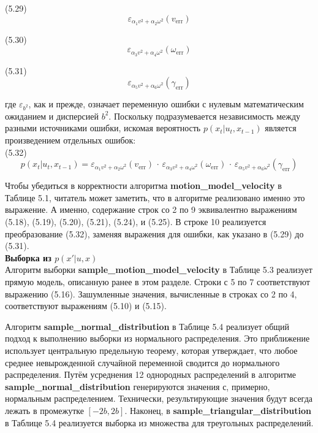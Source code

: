 \documentclass[10pt,a4paper]{article}
\begin{document}
(5.29)
$$\varepsilon_{\alpha_1v^2+\alpha_2\omega^2}(v_{\text{err}})$$

(5.30)
$$\varepsilon_{\alpha_3v^2+\alpha_4\omega^2}(\omega_{\text{err}})$$

(5.31)
$$\varepsilon_{\alpha_5v^2+\alpha_6\omega^2}(\gamma_{\text{err}})$$

где $\varepsilon_{b^2}$, как и прежде, означает переменную ошибки с нулевым математическим ожиданием и дисперсией $b^2$.
Поскольку подразумевается независимость между разными источниками ошибки, искомая вероятность $p(x_t | u_t, x_{t-1})$ является произведением отдельных ошибок:\\

(5.32)
$$p(x_t|u_t,x_{t-1})=\varepsilon_{\alpha_1v^2+\alpha_2\omega^2}(v_{\text{err}})\,\cdot\,\varepsilon_{\alpha_3v^2+\alpha_4\omega^2}(\omega_{\text{err}})\,\cdot\,\varepsilon_{\alpha_5v^2+\alpha_6\omega^2}(\gamma_{\text{err}})$$

Чтобы убедиться в корректности алгоритма \textbf{motion\_model\_velocity} в Таблице 5.1,
читатель может заметить, что в алгоритме реализовано именно это выражение. А именно, содержание строк со 2 по 9 эквивалентно выражениям (5.18), (5.19), (5.20), (5.21), (5.24), и (5.25). В строке 10 реализуется преобразование (5.32), заменяя выражения для ошибки, как указано в (5.29) до (5.31).\\

\textbf{Выборка из $p(x' | u, x)$}\\

Алгоритм выборки \textbf{sample\_motion\_model\_velocity} в Таблице 5.3 реализует прямую модель, описанную ранее в этом разделе. Строки с 5 по 7 соответствуют выражению (5.16). Зашумленные значения, вычисленные в строках со 2 по 4, соответствуют выражениям (5.10) и (5.15).

Алгоритм \textbf{sample\_normal\_distribution} в Таблице 5.4 реализует общий подход к выполнению выборки из нормального распределения. Это приближение использует центральную предельную теорему, которая утверждает, что любое среднее невырожденной случайной переменной сводится до нормального распределения. Путём усреднения 12 однородных распределений в алгоритме \textbf{sample\_normal\_distribution}
генерируются значения с, примерно, нормальным распределением. Технически, результирующие значения будут всегда лежать в промежутке $[-2b,2b]$. Наконец, в  \textbf{sample\_triangular\_distribution} в Таблице 5.4 реализуется выборка из множества для треугольных распределений.\\
\end{document}
